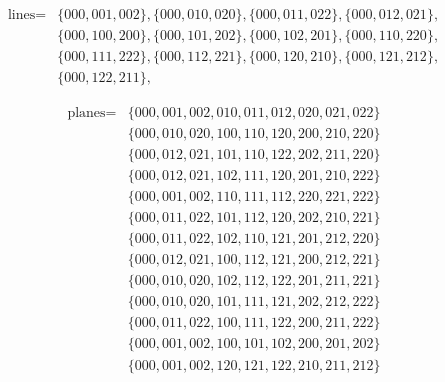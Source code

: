 \documentclass[14pt]{chalkfjord}
\begin{document}
\begin{frame}
\scriptsize 
  \begin{align*}
    \mbox{lines} = & \{ 000,001,002 \}, \{ 000,010,020 \}, \{ 000,011,022 \}, \{ 000,012,021 \},\\
    & \{ 000,100,200 \}, \{ 000,101,202 \}, \{ 000,102,201 \}, \{ 000,110,220 \},\\
    & \{ 000,111,222 \}, \{ 000,112,221 \}, \{ 000,120,210 \}, \{ 000,121,212 \},\\
    & \{ 000,122,211 \},
  \end{align*}

  \begin{align*}
    \mbox{planes} = & \{ 000,001,002,010,011,012,020,021,022 \}\\
    & \{ 000,010,020,100,110,120,200,210,220 \}\\
    & \{ 000,012,021,101,110,122,202,211,220 \}\\
    & \{ 000,012,021,102,111,120,201,210,222 \}\\
    & \{ 000,001,002,110,111,112,220,221,222 \}\\
    & \{ 000,011,022,101,112,120,202,210,221 \}\\
    & \{ 000,011,022,102,110,121,201,212,220 \}\\
    & \{ 000,012,021,100,112,121,200,212,221 \}\\
    & \{ 000,010,020,102,112,122,201,211,221 \}\\
    & \{ 000,010,020,101,111,121,202,212,222 \}\\
    & \{ 000,011,022,100,111,122,200,211,222 \}\\
    & \{ 000,001,002,100,101,102,200,201,202 \}\\
    & \{ 000,001,002,120,121,122,210,211,212 \}
  \end{align*}
    
\end{frame}
\end{document}
